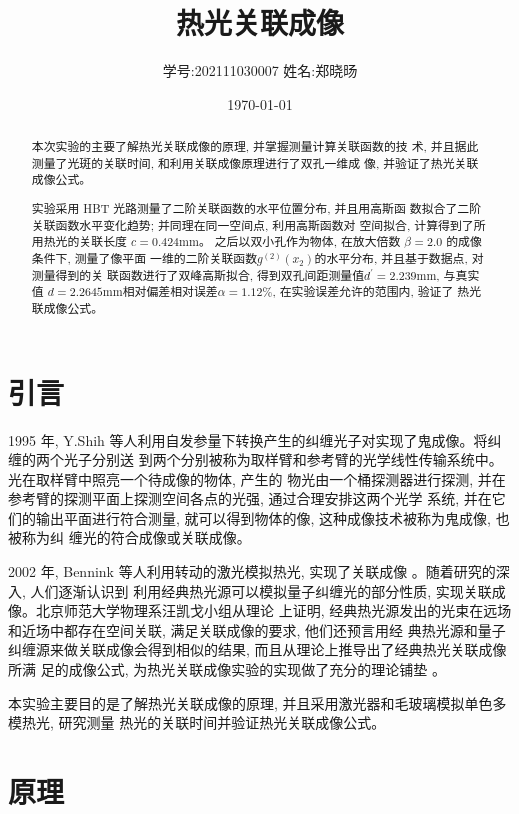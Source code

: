 \documentclass[12pt,a4paper]{article}
\title{\vspace{-4cm}\Large 热光关联成像}  %
\author{\kaishu 学号:202111030007 \hspace{2cm} 姓名:郑晓旸}   %
\date{\today}  %
\begin{document}
\maketitle

\begin{abstract}
    本次实验的主要了解热光关联成像的原理, 并掌握测量计算关联函数的技
术, 并且据此测量了光斑的关联时间, 和利用关联成像原理进行了双孔一维成
像, 并验证了热光关联成像公式。

实验采用 HBT 光路测量了二阶关联函数的水平位置分布, 并且用高斯函
数拟合了二阶关联函数水平变化趋势; 并同理在同一空间点, 利用高斯函数对
空间拟合, 计算得到了所用热光的关联长度 $c = 0.424 \mathrm{mm}$。
之后以双小孔作为物体, 在放大倍数 $\beta = 2.0$ 的成像条件下, 测量了像平面
一维的二阶关联函数$ g^{(2)}(x_2) $的水平分布, 并且基于数据点, 对测量得到的关
联函数进行了双峰高斯拟合, 得到双孔间距测量值$ d^{\prime} = 2.239\mathrm{mm}$, 与真实值
$d = 2.2645\mathrm{mm} $相对偏差相对误差$ \alpha = 1.12\%$, 
在实验误差允许的范围内, 验证了
热光联成像公式。
\end{abstract}

\section{引言}
1995 年, Y.Shih 等人利用自发参量下转换产生的纠缠光子对实现了鬼成像\cite{shih1995quantum}。将纠缠的两个光子分别送
到两个分别被称为取样臂和参考臂的光学线性传输系统中。光在取样臂中照亮一个待成像的物体, 产生的
物光由一个桶探测器进行探测, 并在参考臂的探测平面上探测空间各点的光强, 通过合理安排这两个光学
系统, 并在它们的输出平面进行符合测量, 就可以得到物体的像, 这种成像技术被称为鬼成像, 也被称为纠
缠光的符合成像或关联成像。

2002 年, Bennink 等人利用转动的激光模拟热光, 实现了关联成像\cite{bennink2002two}
。随着研究的深入, 人们逐渐认识到
利用经典热光源可以模拟量子纠缠光的部分性质, 实现关联成像。北京师范大学物理系汪凯戈小组从理论
上证明, 经典热光源发出的光束在远场和近场中都存在空间关联, 满足关联成像的要求, 他们还预言用经
典热光源和量子纠缠源来做关联成像会得到相似的结果, 而且从理论上推导出了经典热光关联成像所满
足的成像公式, 为热光关联成像实验的实现做了充分的理论铺垫\cite{wang2004far,wang2005near}
。

本实验主要目的是了解热光关联成像的原理, 并且采用激光器和毛玻璃模拟单色多模热光, 研究测量
热光的关联时间并验证热光关联成像公式\cite{gatti2008ghost,scarcelli2006can}。


\section{原理}
\end{document}
